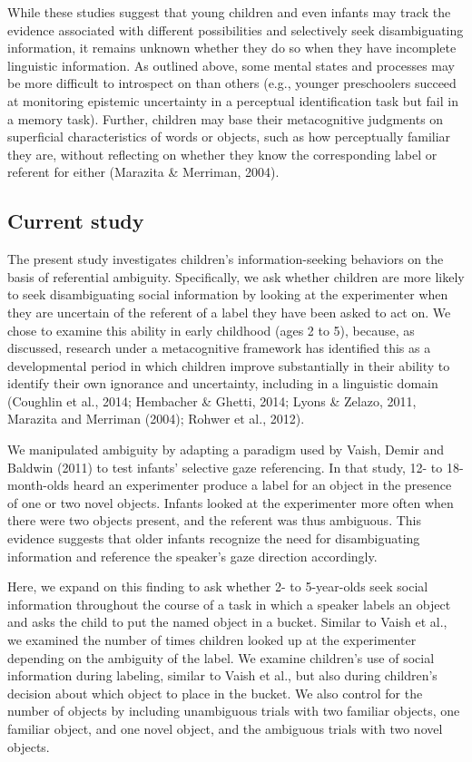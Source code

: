 \documentclass[english,,man]{apa6}
\begin{document}
While these studies suggest that young children and even infants may
track the evidence associated with different possibilities and
selectively seek disambiguating information, it remains unknown whether
they do so when they have incomplete linguistic information. As outlined
above, some mental states and processes may be more difficult to
introspect on than others (e.g., younger preschoolers succeed at
monitoring epistemic uncertainty in a perceptual identification task but
fail in a memory task). Further, children may base their metacognitive
judgments on superficial characteristics of words or objects, such as
how perceptually familiar they are, without reflecting on whether they
know the corresponding label or referent for either (Marazita \&
Merriman, 2004).

\subsection{Current study}\label{current-study}

The present study investigates children's information-seeking behaviors
on the basis of referential ambiguity. Specifically, we ask whether
children are more likely to seek disambiguating social information by
looking at the experimenter when they are uncertain of the referent of a
label they have been asked to act on. We chose to examine this ability
in early childhood (ages 2 to 5), because, as discussed, research under
a metacognitive framework has identified this as a developmental period
in which children improve substantially in their ability to identify
their own ignorance and uncertainty, including in a linguistic domain
(Coughlin et al., 2014; Hembacher \& Ghetti, 2014; Lyons \& Zelazo,
2011, Marazita and Merriman (2004); Rohwer et al., 2012).

We manipulated ambiguity by adapting a paradigm used by Vaish, Demir and
Baldwin (2011) to test infants' selective gaze referencing. In that
study, 12- to 18-month-olds heard an experimenter produce a label for an
object in the presence of one or two novel objects. Infants looked at
the experimenter more often when there were two objects present, and the
referent was thus ambiguous. This evidence suggests that older infants
recognize the need for disambiguating information and reference the
speaker's gaze direction accordingly.

Here, we expand on this finding to ask whether 2- to 5-year-olds seek
social information throughout the course of a task in which a speaker
labels an object and asks the child to put the named object in a bucket.
Similar to Vaish et al., we examined the number of times children looked
up at the experimenter depending on the ambiguity of the label. We
examine children's use of social information during labeling, similar to
Vaish et al., but also during children's decision about which object to
place in the bucket. We also control for the number of objects by
including unambiguous trials with two familiar objects, one familiar
object, and one novel object, and the ambiguous trials with two novel
objects.
\end{document}
